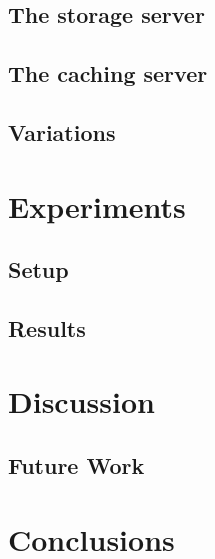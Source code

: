 \documentclass[twoside,openright]{uva-bachelor-thesis}
\begin{document}
\section{The storage server}
\section{The caching server} \section{Variations}

\chapter{Experiments}
\section{Setup}
\section{Results}

\chapter{Discussion}
\section{Future Work}
\chapter{Conclusions}


\printbibliography{}
\end{document}
